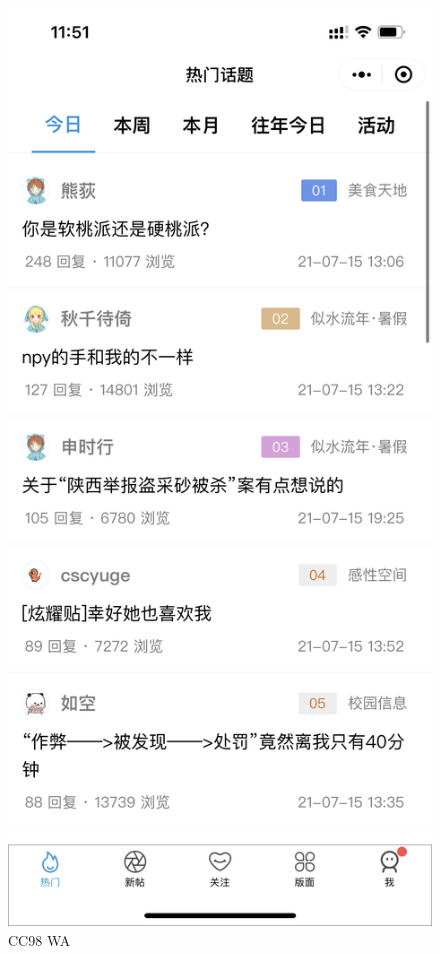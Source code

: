 \documentclass[a4paper,12pt]{texMemo}
\begin{document}
\begin{enumerate}
\begin{figure}[H]
\begin{minipage}[t]{0.5\linewidth}
    \label{fig:side:a}
  \end{minipage}%
  \begin{minipage}[t]{0.5\linewidth}
    \centering
    \includegraphics[scale=0.07]{IMG_2921.PNG}
    \caption{CC98 WA}
    \label{fig:side:b}
  \end{minipage}
\end{figure}



\end{enumerate}
\end{document}
